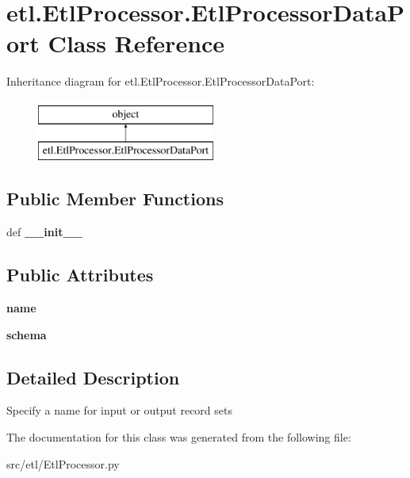 \hypertarget{classetl_1_1EtlProcessor_1_1EtlProcessorDataPort}{\section{etl.\-Etl\-Processor.\-Etl\-Processor\-Data\-Port Class Reference}
\label{classetl_1_1EtlProcessor_1_1EtlProcessorDataPort}
}
Inheritance diagram for etl.\-Etl\-Processor.\-Etl\-Processor\-Data\-Port\-:\begin{figure}[H]
\begin{center}
\leavevmode
\includegraphics[height=2.000000cm]{classetl_1_1EtlProcessor_1_1EtlProcessorDataPort}
\end{center}
\end{figure}
\subsection*{Public Member Functions}
\begin{DoxyCompactItemize}
\item 
\hypertarget{classetl_1_1EtlProcessor_1_1EtlProcessorDataPort_a5af394c5e2bd3873b965c89ad367a7d3}{def {\bfseries \-\_\-\-\_\-init\-\_\-\-\_\-}}\label{classetl_1_1EtlProcessor_1_1EtlProcessorDataPort_a5af394c5e2bd3873b965c89ad367a7d3}

\end{DoxyCompactItemize}
\subsection*{Public Attributes}
\begin{DoxyCompactItemize}
\item 
\hypertarget{classetl_1_1EtlProcessor_1_1EtlProcessorDataPort_a8826839584c592bd39e0d5dd5fed939d}{{\bfseries name}}\label{classetl_1_1EtlProcessor_1_1EtlProcessorDataPort_a8826839584c592bd39e0d5dd5fed939d}

\item 
\hypertarget{classetl_1_1EtlProcessor_1_1EtlProcessorDataPort_a9c951d12496f5094604451f8a445f956}{{\bfseries schema}}\label{classetl_1_1EtlProcessor_1_1EtlProcessorDataPort_a9c951d12496f5094604451f8a445f956}

\end{DoxyCompactItemize}


\subsection{Detailed Description}
\begin{DoxyVerb}Specify a name for input or output record sets\end{DoxyVerb}
 

The documentation for this class was generated from the following file\-:\begin{DoxyCompactItemize}
\item 
src/etl/Etl\-Processor.\-py\end{DoxyCompactItemize}
